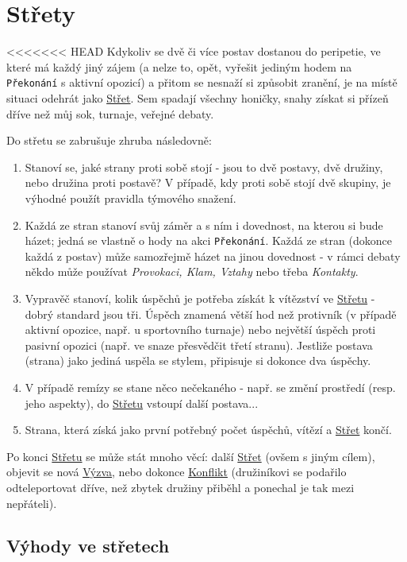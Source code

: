 \documentclass[../main.tex]{subfiles}
\begin{document}
\section{Střety}
\label{sec:strety}

<<<<<<< HEAD
Kdykoliv se dvě či více postav dostanou do peripetie, ve které má každý jiný zájem (a nelze to, opět, vyřešit jediným hodem na \texttt{Překonání} s aktivní opozicí) a přitom se nesnaží si způsobit zranění, je na místě situaci odehrát jako \underline{Střet}. Sem spadají všechny honičky, snahy získat si přízeň dříve než můj sok, turnaje, veřejné debaty.

Do střetu se zabrušuje zhruba následovně:
\begin{enumerate}
\item Stanoví se, jaké strany proti sobě stojí - jsou to dvě postavy, dvě družiny, nebo družina proti postavě? V případě, kdy proti sobě stojí dvě skupiny, je výhodné použít pravidla týmového snažení.
\item Každá ze stran stanoví svůj záměr a s ním i dovednost, na kterou si bude házet; jedná se vlastně o hody na akci \texttt{Překonání}. Každá ze stran (dokonce každá z postav) může samozřejmě házet na jinou dovednost - v rámci debaty někdo může používat \textit{Provokaci, Klam, Vztahy} nebo třeba \textit{Kontakty}. 

\item Vypravěč stanoví, kolik úspěchů je potřeba získát k vítězství ve \underline{Střetu} - dobrý standard jsou tři. Úspěch znamená větší hod než protivník (v případě aktivní opozice, např. u sportovního turnaje) nebo největší úspěch proti pasivní opozici (např. ve snaze přesvědčit třetí stranu). Jestliže postava (strana) jako jediná uspěla se stylem, připisuje si dokonce dva úspěchy.
\item V případě remízy se stane něco nečekaného - např. se změní prostředí (resp. jeho aspekty), do \underline{Střetu} vstoupí další postava...
\item Strana, která získá jako první potřebný počet úspěchů, vítězí a \underline{Střet} končí.
\end{enumerate}

Po konci \underline{Střetu} se může stát mnoho věcí: další \underline{Střet} (ovšem s jiným cílem), objevit se nová \underline{Výzva}, nebo dokonce \underline{Konflikt} (družiníkovi se podařilo odteleportovat dříve, než zbytek družiny přiběhl a ponechal je tak mezi nepřáteli).

\subsection{Výhody ve střetech}
\label{sec:výhody-střety}
\end{document}
